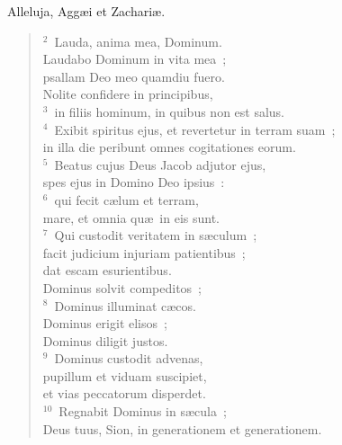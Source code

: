 \bchapter
\lettrine[lines=3,image=true,loversize=0.05,lraise=-0.03]{A}{}lleluja, Agg\ae i et Zachari\ae .
\begin{flushleft}\begin{verse}\vspace{6pt}${}^{2}$~Lauda, anima mea, Dominum.\\ Laudabo Dominum in vita mea~;\\ psallam Deo meo quamdiu fuero.\\ Nolite confidere in principibus,\\
${}^{3}$~in filiis hominum, in quibus non est salus.\\
${}^{4}$~Exibit spiritus ejus, et revertetur in terram suam~;\\ in illa die peribunt omnes cogitationes eorum.\\
${}^{5}$~Beatus cujus Deus Jacob adjutor ejus,\\ spes ejus in Domino Deo ipsius~:\\
${}^{6}$~qui fecit c\ae lum et terram,\\ mare, et omnia qu\ae\ in eis sunt.\\
${}^{7}$~Qui custodit veritatem in s\ae culum~;\\ facit judicium injuriam patientibus~;\\ dat escam esurientibus.\\ Dominus solvit compeditos~;\\
${}^{8}$~Dominus illuminat c\ae cos.\\ Dominus erigit elisos~;\\ Dominus diligit justos.\\
${}^{9}$~Dominus custodit advenas,\\ pupillum et viduam suscipiet,\\ et vias peccatorum disperdet.\\
${}^{10}$~Regnabit Dominus in s\ae cula~;\\ Deus tuus, Sion, in generationem et generationem.\end{verse}\end{flushleft}




